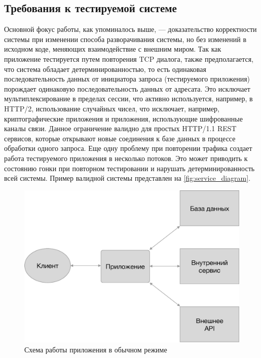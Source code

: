 \subsection{Требования к тестируемой системе}
Основной фокус работы, как упоминалось выше, --- доказательство корректности
системы при изменении способа разворачивания системы, но без изменений в
исходном коде, меняющих взаимодействие с внешним миром.
Так как приложение тестируется путем повторения TCP диалога, также
предполагается, что система обладает детерминированностью, то есть
одинаковая последовательность данных от инициатора запроса (тестируемого
приложения) порождает одинаковую последовательность данных от адресата. Это
исключает мультиплексирование в пределах сессии, что активно используется,
например, в HTTP/2, использование случайных чисел, что исключает, например,
криптографические приложения и приложения, использующие шифрованные каналы
связи.  Данное ограничение валидно для простых HTTP/1.1 REST сервисов, которые
открывают новые соединения к базе данных в процессе обработки одного запроса.
Еще одну проблему при повторении трафика создает работа тестируемого
приложения в несколько потоков. Это может приводить к состоянию гонки при
повторном тестировании и нарушать детерминированность всей системы.
Пример валидной системы представлен на \autoref{fig:service_diagram}.

\begin{figure}[H]
\includegraphics[width=\textwidth,height=\textheight,keepaspectratio]
    {img/service_diagram.eps}
\caption{Схема работы приложения в обычном режиме}
\label{fig:service_diagram}
\end{figure}

